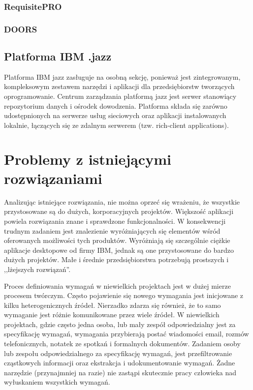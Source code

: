       \subsubsection{RequisitePRO}
      \subsubsection{DOORS}

    \subsection{Platforma IBM .jazz}

      Platforma IBM jazz zasługuje na osobną sekcję, ponieważ jest zintegrowanym, kompleksowym zestawem narzędzi i aplikacji dla przedsiębiorstw tworzących oprogramowanie. Centrum zarządzania platformą jazz jest serwer stanowiący repozytorium danych i ośrodek dowodzenia. Platforma składa się zarówno udostępnionych na serwerze usług sieciowych oraz aplikacji instalowanych lokalnie, łączących się ze zdalnym serwerem (tzw. rich-client applications). 

  \section{Problemy z istniejącymi rozwiązaniami}

      Analizując istniejące rozwiązania, nie można oprzeć się wrażeniu, że wszystkie przystosowane są do dużych, korporacyjnych projektów. Większość aplikacji powiela rozwiązania znane i sprawdzone funkcjonalności. W konsekwencji trudnym zadaniem jest znalezienie wyróżniających się elementów wśród oferowanych możliwości tych produktów. Wyróżniają się szczególnie ciężkie aplikacje desktopowe od firmy IBM, jednak są one przystosowane do bardzo dużych projektów. Małe i średnie przedsiębiorstwa potrzebują prostszych i ,,lżejszych rozwiązań''. 

      Proces definiowania wymagań w niewielkich projektach jest w dużej mierze procesem twórczym. Często pojawienie się nowego wymagania jest inicjowane z kilku heterogenicznych źródeł. Nierzadko zdarza się również, że to samo wymaganie jest różnie komunikowane przez wiele źródeł. W niewielkich projektach, gdzie często jedna osoba, lub mały zespół odpowiedzialny jest za specyfikację wymagań, wymagania przybierają postać wiadomości email, rozmów telefonicznych, notatek ze spotkań i formalnych dokumentów. Zadaniem osoby lub zespołu odpowiedzialnego za specyfikację wymagań, jest przefiltrowanie cząstkowych informacji oraz ekstrakcja i udokumentowanie wymagań. Żadne narzędzie (przynajmniej na razie) nie zastąpi skutecznie pracy człowieka nad wyłuskaniem wszystkich wymagań. 
